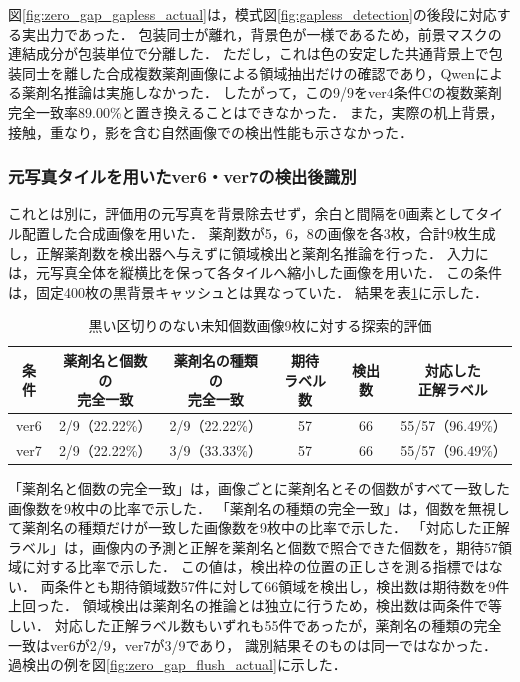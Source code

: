\documentclass[uplatex,dvipdfmx]{jsarticle}
\begin{document}
図\ref{fig:zero_gap_gapless_actual}は，模式図\ref{fig:gapless_detection}の後段に対応する実出力であった．
包装同士が離れ，背景色が一様であるため，前景マスクの連結成分が包装単位で分離した．
ただし，これは色の安定した共通背景上で包装同士を離した合成複数薬剤画像による領域抽出だけの確認であり，Qwenによる薬剤名推論は実施しなかった．
したがって，この9/9をver4条件Cの複数薬剤完全一致率89.00\%と置き換えることはできなかった．
また，実際の机上背景，接触，重なり，影を含む自然画像での検出性能も示さなかった．

\subsubsection{元写真タイルを用いたver6・ver7の検出後識別}\label{sec:zero_gap_identification}

これとは別に，評価用の元写真を背景除去せず，余白と間隔を0画素としてタイル配置した合成画像を用いた．
薬剤数が5，6，8の画像を各3枚，合計9枚生成し，正解薬剤数を検出器へ与えずに領域検出と薬剤名推論を行った．
入力には，元写真全体を縦横比を保って各タイルへ縮小した画像を用いた．
この条件は，固定400枚の黒背景キャッシュとは異なっていた．
結果を表\ref{tab:zero_gap_end_to_end}に示した．

\begin{table}[htbp]
  \centering
  \caption{黒い区切りのない未知個数画像9枚に対する探索的評価}
  \label{tab:zero_gap_end_to_end}
  \small
  \setlength{\tabcolsep}{4pt}
  \begin{tabular}{|c|c|c|c|c|c|}
    \hline
    条件 & \shortstack{薬剤名と個数の\\完全一致} & \shortstack{薬剤名の種類の\\完全一致} & \shortstack{期待\\ラベル数} & 検出数 & \shortstack{対応した\\正解ラベル} \\ \hline
    ver6 & 2/9（22.22\%） & 2/9（22.22\%） & 57 & 66 & 55/57（96.49\%） \\ \hline
    ver7 & 2/9（22.22\%） & 3/9（33.33\%） & 57 & 66 & 55/57（96.49\%） \\ \hline
  \end{tabular}
\end{table}

「薬剤名と個数の完全一致」は，画像ごとに薬剤名とその個数がすべて一致した画像数を9枚中の比率で示した．
「薬剤名の種類の完全一致」は，個数を無視して薬剤名の種類だけが一致した画像数を9枚中の比率で示した．
「対応した正解ラベル」は，画像内の予測と正解を薬剤名と個数で照合できた個数を，期待57領域に対する比率で示した．
この値は，検出枠の位置の正しさを測る指標ではない．
両条件とも期待領域数57件に対して66領域を検出し，検出数は期待数を9件上回った．
領域検出は薬剤名の推論とは独立に行うため，検出数は両条件で等しい．
対応した正解ラベル数もいずれも55件であったが，薬剤名の種類の完全一致はver6が2/9，ver7が3/9であり，
識別結果そのものは同一ではなかった．
過検出の例を図\ref{fig:zero_gap_flush_actual}に示した．
\end{document}
